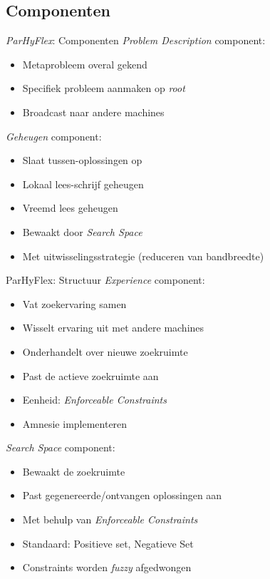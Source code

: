 \documentclass[handout]{beamer}
\begin{document}
\subsection{Componenten}
\begin{frame}{\emph{ParHyFlex}: Componenten}
\emph{Problem Description} component:
\begin{itemize}[<+->]
 \item Metaprobleem overal gekend
 \item Specifiek probleem aanmaken op \emph{root}
 \item Broadcast naar andere machines
\end{itemize}
\emph{Geheugen} component:
\begin{itemize}[<+->]
 \item Slaat tussen-oplossingen op
 \item Lokaal lees-schrijf geheugen
 \item Vreemd lees geheugen
 \item Bewaakt door \emph{Search Space}
 \item Met uitwisselingsstrategie (reduceren van bandbreedte)
\end{itemize}
\end{frame}
\begin{frame}{ParHyFlex: Structuur}
\emph{Experience} component:
\begin{itemize}[<+->]
 \item Vat zoekervaring samen
 \item Wisselt ervaring uit met andere machines
 \item Onderhandelt over nieuwe zoekruimte
 \item Past de actieve zoekruimte aan
 \item Eenheid: \emph{Enforceable Constraints}
 \item Amnesie implementeren
\end{itemize}
\emph{Search Space} component:
\begin{itemize}[<+->]
 \item Bewaakt de zoekruimte
 \item Past gegenereerde/ontvangen oplossingen aan
 \item Met behulp van \emph{Enforceable Constraints}
 \item Standaard: Positieve set, Negatieve Set
 \item Constraints worden \emph{fuzzy} afgedwongen
\end{itemize}
\end{frame}
\end{document}
